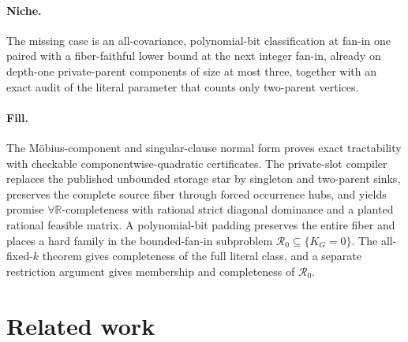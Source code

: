 \documentclass{article}
\begin{document}
\paragraph{Niche.} The missing case is an all-covariance, polynomial-bit classification at fan-in one paired with a fiber-faithful lower bound at the next integer fan-in, already on depth-one private-parent components of size at most three, together with an exact audit of the literal parameter that counts only two-parent vertices.

\paragraph{Fill.} The Möbius-component and singular-clause normal form proves exact tractability with checkable componentwise-quadratic certificates. The private-slot compiler replaces the published unbounded storage star by singleton and two-parent sinks, preserves the complete source fiber through forced occurrence hubs, and yields promise \(\forall\mathbb R\)-completeness with rational strict diagonal dominance and a planted rational feasible matrix. A polynomial-bit padding preserves the entire fiber and places a hard family in the bounded-fan-in subproblem \(\mathcal R_0\subseteq\{K_G=0\}\). The all-fixed-\(k\) theorem gives completeness of the full literal class, and a separate restriction argument gives membership and completeness of \(\mathcal R_0\).

\section{Related work}
\end{document}
